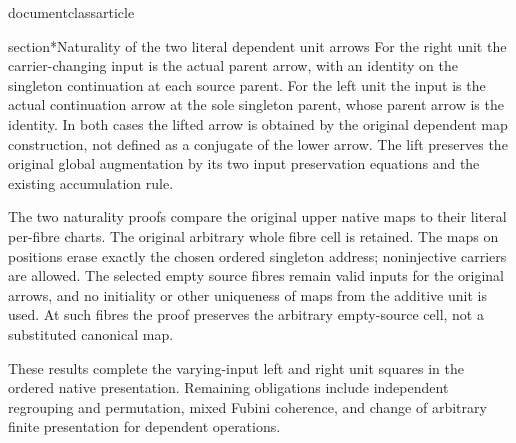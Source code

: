 documentclass{article}

section*{Naturality of the two literal dependent unit arrows}
For the right unit the carrier-changing input is the actual parent
arrow, with an identity on the singleton continuation at each
source parent. For the left unit the input is the actual continuation
arrow at the sole singleton parent, whose parent arrow is the
identity. In both cases the lifted arrow is obtained by the original
dependent map construction, not defined as a conjugate of the lower
arrow. The lift preserves the original global augmentation by its two
input preservation equations and the existing accumulation rule.

The two naturality proofs compare the original upper native maps to
their literal per-fibre charts. The original arbitrary whole fibre
cell is retained. The maps on positions erase exactly the chosen
ordered singleton address; noninjective carriers are allowed. The
selected empty source fibres remain valid inputs for the original
arrows, and no initiality or other uniqueness of maps from the
additive unit is used. At such fibres the proof preserves the
arbitrary empty-source cell, not a substituted canonical map.

These results complete the varying-input left and right unit squares
in the ordered native presentation. Remaining obligations include
independent regrouping and permutation, mixed Fubini coherence, and
change of arbitrary finite presentation for dependent operations.

